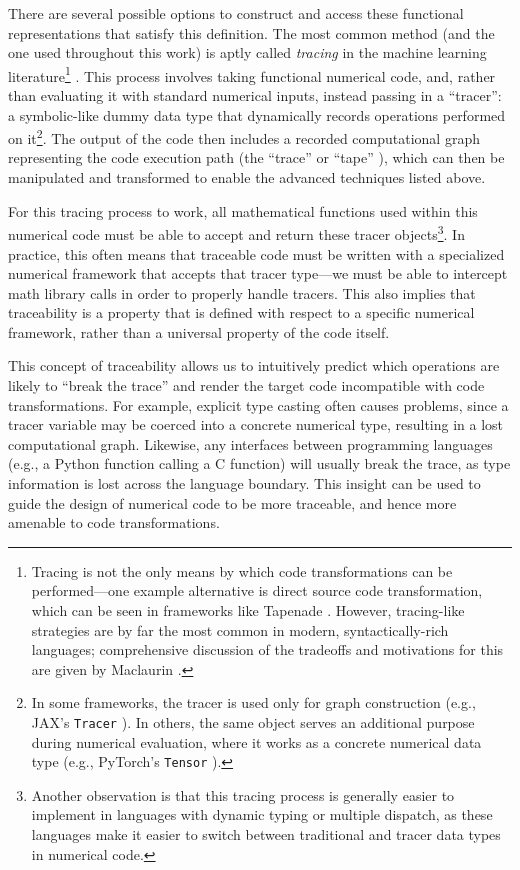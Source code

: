There are several possible options to construct and access these functional representations that satisfy this definition. The most common method (and the one used throughout this work) is aptly called \emph{tracing} in the machine learning literature\footnote{Tracing is not the only means by which code transformations can be performed—one example alternative is direct source code transformation, which can be seen in frameworks like Tapenade \cite{tapenade}. However, tracing-like strategies are by far the most common in modern, syntactically-rich languages; comprehensive discussion of the tradeoffs and motivations for this are given by Maclaurin \cite{maclaurin_modeling_2016}.} \cite{jax, frostig_compiling_2018, baydin_automatic_2018}. This process involves taking functional numerical code, and, rather than evaluating it with standard numerical inputs, instead passing in a ``tracer'': a symbolic-like dummy data type that dynamically records operations performed on it\footnote{In some frameworks, the tracer is used only for graph construction (e.g., JAX's \texttt{Tracer} \cite{jax}). In others, the same object serves an additional purpose during numerical evaluation, where it works as a concrete numerical data type (e.g., PyTorch's \texttt{Tensor} \cite{paszke_pytorch_2019}).}. The output of the code then includes a recorded computational graph representing the code execution path (the ``trace'' or ``tape'' \cite{paszke_pytorch_2019}), which can then be manipulated and transformed to enable the advanced techniques listed above.

For this tracing process to work, all mathematical functions used within this numerical code must be able to accept and return these tracer objects\footnote{Another observation is that this tracing process is generally easier to implement in languages with dynamic typing or multiple dispatch, as these languages make it easier to switch between traditional and tracer data types in numerical code.}. In practice, this often means that traceable code must be written with a specialized numerical framework that accepts that tracer type—we must be able to intercept math library calls in order to properly handle tracers. This also implies that traceability is a property that is defined with respect to a specific numerical framework, rather than a universal property of the code itself.

This concept of traceability allows us to intuitively predict which operations are likely to ``break the trace'' and render the target code incompatible with code transformations. For example, explicit type casting often causes problems, since a tracer variable may be coerced into a concrete numerical type, resulting in a lost computational graph. Likewise, any interfaces between programming languages (e.g., a Python function calling a C function) will usually break the trace, as type information is lost across the language boundary. This insight can be used to guide the design of numerical code to be more traceable, and hence more amenable to code transformations.

